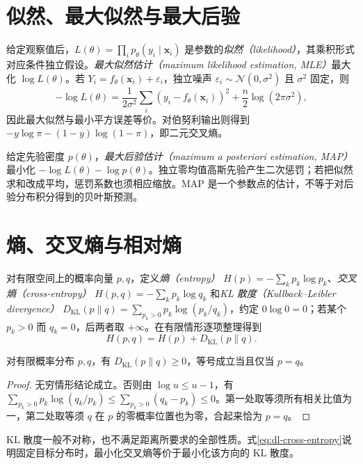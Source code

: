 \section{似然、最大似然与最大后验}
给定观察值后，$L(\theta)=\prod_ip_\theta(y_i\mid\mathbf x_i)$ 是参数的\emph{似然（likelihood）}，其乘积形式对应条件独立假设。\emph{最大似然估计（maximum likelihood estimation, MLE）}最大化 $\log L(\theta)$。若 $Y_i=f_\theta(\mathbf x_i)+\varepsilon_i$，独立噪声 $\varepsilon_i\sim\mathcal N(0,\sigma^2)$ 且 $\sigma^2$ 固定，则
\[
-\log L(\theta)=\frac1{2\sigma^2}\sum_i(y_i-f_\theta(\mathbf x_i))^2+\frac n2\log(2\pi\sigma^2),
\]
因此最大似然与最小平方误差等价。对伯努利输出则得到 $-y\log\pi-(1-y)\log(1-\pi)$，即二元交叉熵。

给定先验密度 $p(\theta)$，\emph{最大后验估计（maximum a posteriori estimation, MAP）}最小化 $-\log L(\theta)-\log p(\theta)$。独立零均值高斯先验产生二次惩罚；若把似然求和改成平均，惩罚系数也须相应缩放。MAP 是一个参数点的估计，不等于对后验分布积分得到的贝叶斯预测。

\section{熵、交叉熵与相对熵}
对有限空间上的概率向量 $p,q$，定义\emph{熵（entropy）} $H(p)=-\sum_kp_k\log p_k$、\emph{交叉熵（cross-entropy）} $H(p,q)=-\sum_kp_k\log q_k$ 和\emph{KL 散度（Kullback--Leibler divergence）} $D_{\mathrm{KL}}(p\|q)=\sum_{p_k>0}p_k\log(p_k/q_k)$，约定 $0\log0=0$；若某个 $p_k>0$ 而 $q_k=0$，后两者取 $+\infty$。在有限情形逐项整理得到
\begin{equation}
H(p,q)=H(p)+D_{\mathrm{KL}}(p\|q).
\label{eq:dl-cross-entropy}
\end{equation}
\begin{proposition}[KL 散度非负]
对有限概率分布 $p,q$，有 $D_{\mathrm{KL}}(p\|q)\geq0$，等号成立当且仅当 $p=q$。
\end{proposition}
\begin{proof}
无穷情形结论成立。否则由 $\log u\leq u-1$，有 $\sum_{p_k>0}p_k\log(q_k/p_k)\leq\sum_{p_k>0}(q_k-p_k)\leq0$。第一处取等须所有相关比值为一，第二处取等须 $q$ 在 $p$ 的零概率位置也为零，合起来恰为 $p=q$。
\end{proof}
KL 散度一般不对称，也不满足距离所要求的全部性质。式\eqref{eq:dl-cross-entropy}说明固定目标分布时，最小化交叉熵等价于最小化该方向的 KL 散度。

